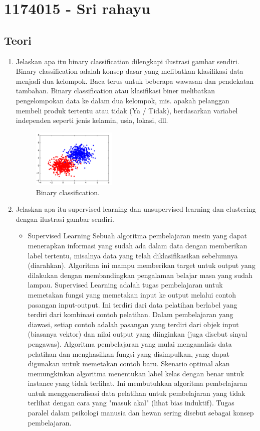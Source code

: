\section{1174015 - Sri rahayu}
\subsection{Teori}
\begin{enumerate}

	\item Jelaskan apa itu binary classification dilengkapi ilustrasi gambar sendiri.
	\hfill\break
	Binary classification adalah konsep dasar yang melibatkan klasifikasi data menjadi dua kelompok. Baca terus untuk beberapa wawasan dan pendekatan tambahan. Binary classification atau klasifikasi biner melibatkan pengelompokan data ke dalam dua kelompok, mis. apakah pelanggan membeli produk tertentu atau tidak (Ya / Tidak), berdasarkan variabel independen seperti jenis kelamin, usia, lokasi, dll.

	\begin{figure}[H]
	\centering
		\includegraphics[width=4cm]{figures/1174015/tugas2/materi/1.png}
		\caption{Binary classification.}
	\end{figure}

	\item Jelaskan apa itu supervised learning dan unsupervised learning dan clustering dengan ilustrasi gambar sendiri.
	\hfill\break

	\begin{itemize}
		\item Supervised Learning
		\hfill\break
		Sebuah algoritma pembelajaran mesin yang dapat menerapkan informasi yang sudah ada dalam data dengan memberikan label tertentu, misalnya data yang telah diklasifikasikan sebelumnya (diarahkan). Algoritma ini mampu memberikan target untuk output yang dilakukan dengan membandingkan pengalaman belajar masa yang sudah lampau. Supervised Learning adalah tugas pembelajaran untuk memetakan fungsi yang memetakan input ke output melalui contoh pasangan input-output. Ini terdiri dari data pelatihan berlabel yang terdiri dari kombinasi contoh pelatihan. Dalam pembelajaran yang diawasi, setiap contoh adalah pasangan yang terdiri dari objek input (biasanya vektor) dan nilai output yang diinginkan (juga disebut sinyal pengawas). Algoritma pembelajaran yang mulai menganalisis data pelatihan dan menghasilkan fungsi yang disimpulkan, yang dapat digunakan untuk memetakan contoh baru. Skenario optimal akan memungkinkan algoritma menentukan label kelas dengan benar untuk instance yang tidak terlihat. Ini membutuhkan algoritma pembelajaran untuk menggeneralisasi data pelatihan untuk pembelajaran yang tidak terlihat dengan cara yang "masuk akal" (lihat bias induktif). Tugas paralel dalam psikologi manusia dan hewan sering disebut sebagai konsep pembelajaran.


\end{itemize}
\end{enumerate}
